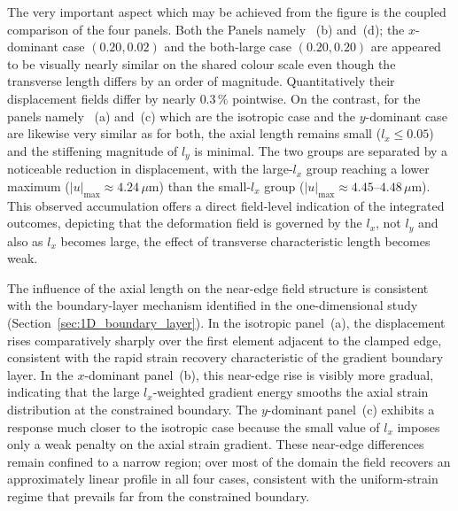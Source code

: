\documentclass[final,3p,times,fleqn]{elsarticle}
\begin{document}
The very important aspect which may be achieved from the  figure is the coupled comparison
of the four panels.
Both the Panels namely ~(b) and~(d); the $x$-dominant case $(0.20,0.02)$ and the
both-large case $(0.20,0.20)$ are appeared to be visually nearly similar on the shared colour scale even though the transverse length differs by
an order of magnitude.  Quantitatively their displacement fields differ by nearly
$0.3\,\%$ pointwise.
On the contrast, for the  panels namely ~(a) and~(c) which are the isotropic case and the
$y$-dominant case are likewise very similar as for both, the
axial length remains small ($l_{x}\le 0.05$) and the stiffening
magnitude of $l_{y}$ is minimal.
The two groups are separated by a noticeable reduction in displacement,
with the large-$l_{x}$ group reaching a lower maximum
($|u|_{\max}\approx 4.24\,\mu\mathrm{m}$) than the small-$l_{x}$ group
($|u|_{\max}\approx 4.45$--$4.48\,\mu\mathrm{m}$).
This observed accumulation offers a direct field-level indication of
the integrated outcomes, depicting that the deformation field is governed by the $l_{x}$, not $l_{y}$ and also as $l_{x}$ becomes large, the effect of  transverse
characteristic length becomes weak.

The influence of the axial length on the near-edge field structure is
consistent with the boundary-layer mechanism identified in the
one-dimensional study (Section~\ref{sec:1D_boundary_layer}).
In the isotropic panel~(a), the displacement rises comparatively
sharply over the first element adjacent to the clamped edge, consistent
with the rapid strain recovery characteristic of the gradient boundary
layer.
In the $x$-dominant panel~(b), this near-edge rise is visibly more
gradual, indicating that the large $l_{x}$-weighted gradient energy
smooths the axial strain distribution at the constrained boundary.
The $y$-dominant panel~(c) exhibits a response much closer to the
isotropic case because the small value of $l_{x}$ imposes only a weak
penalty on the axial strain gradient.
These near-edge differences remain confined to a narrow region; over
most of the domain the field recovers an approximately linear profile
in all four cases, consistent with the uniform-strain regime that
prevails far from the constrained boundary.
\end{document}
